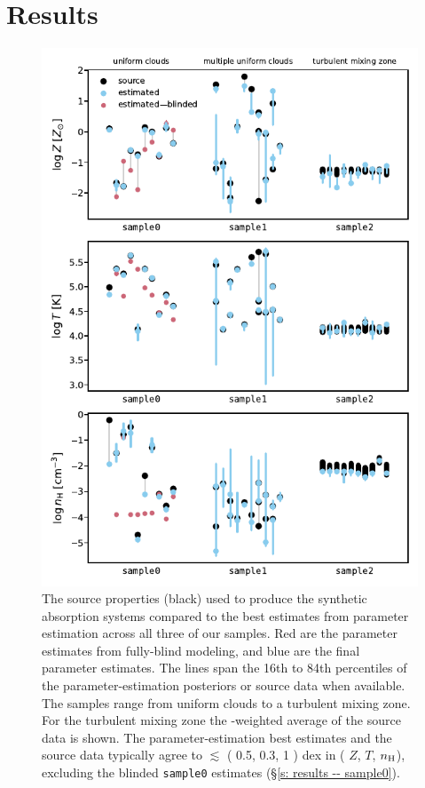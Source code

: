 \documentclass[fleqn,usenatbib]{mnras}
\begin{document}
\section{Results}
\label{s: results}

\begin{figure}
    \centering
    \includegraphics[height=0.9\textheight]{figures/summary.pdf}
    \caption{
    The source properties (black) used to produce the synthetic absorption systems
    compared to the best estimates from parameter estimation across all three of our samples.
    Red are the parameter estimates from fully-blind modeling,
    and blue are the final parameter estimates.
    The lines span the 16th to 84th percentiles of the parameter-estimation posteriors or source data when available.
    The samples range from uniform clouds to a turbulent mixing zone.
    For the turbulent mixing zone the -weighted average of the source data is shown.
    The parameter-estimation best estimates and the source data typically agree to $\lesssim$ ( 0.5, 0.3, 1 ) dex in ( $Z$, $T$, $n_{\rm H}$),
    excluding the blinded \texttt{sample0} estimates (\S\ref{s: results -- sample0}).
    }
    \label{f: summary}
\end{figure}
\end{document}
